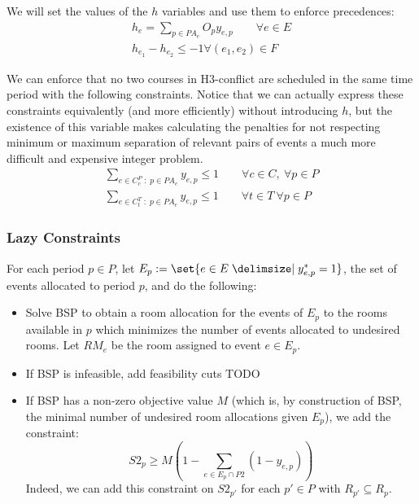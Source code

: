 \documentclass{article}
\theoremstyle{plain}
\numberwithin{theorem}{section}
\numberwithin{example}{section}
\theoremstyle{definition}
\begin{document}
We will set the values of the $h$ variables and use them to enforce precedences:
\begin{gather}
    h_e = \sum_{p \in PA_e} O_p y_{e, p} \qquad \forall e \in E \\
    h_{e_1} - h_{e_2} \leq -1 \forall (e_1, e_2) \in F
\end{gather}

We can enforce that no two courses in H3-conflict are scheduled in the same time
period with the following constraints. Notice that we can actually express these
constraints equivalently (and more efficiently) without introducing $h$, but the
existence of this variable makes calculating the penalties for not respecting
minimum or maximum separation of relevant pairs of events a much more difficult
and expensive integer problem.
\begin{gather}
    \sum_{e \in C^P_c \; : \; p \in PA_e} y_{e,p} \leq 1
        \qquad \forall c \in C, \ \forall p \in P \\
    \sum_{e \in C^T_t \; : \; p \in PA_e} y_{e, p} \leq 1
        \qquad \forall t \in T \ \forall p \in P
\end{gather}

\subsubsection*{Lazy Constraints}
For each period $p \in P$, let $E_p := \set{e \in E \given y^*_{e, p} = 1}$, the
set of events allocated to period $p$, and do the following:
\begin{itemize}
    \item Solve BSP to obtain a room allocation for the events of $E_p$ to the
        rooms available in $p$ which minimizes the number of events allocated to
        undesired rooms. Let $RM_e$ be the room assigned to event $e \in E_p$.
    \item If BSP is infeasible, add feasibility cuts TODO
    \item If BSP has a non-zero objective value $M$ (which is, by construction
        of BSP, the minimal number of undesired room allocations given $E_p$),
        we add the constraint:
        \begin{equation}
            S2_p \geq M \left(1 - \sum_{e \in E_p \cap P2} (1 - y_{e, p})\right)
        \end{equation}
        Indeed, we can add this constraint on $S2_{p'}$ for each $p' \in P$ with
        $R_{p'} \subseteq R_p$.
\end{itemize}
\end{document}
